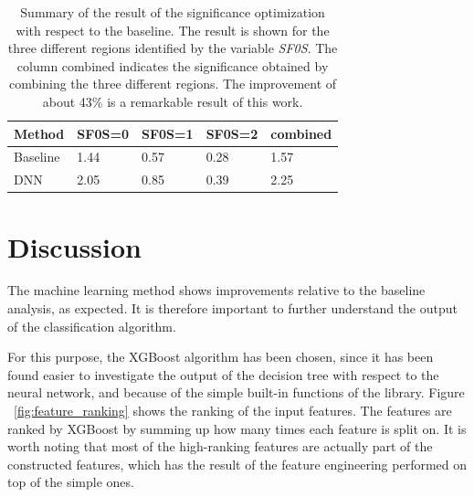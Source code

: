 \documentclass{article}
\begin{document}
\begin{table}[!h]
\centering
    \begin{tabular}{l|l|l|l|l}
    Method              & SF0S=0 & SF0S=1 & SF0S=2 & combined \\
    \hline
    Baseline            & 1.44   & 0.57   & 0.28   & 1.57     \\
    DNN                 & 2.05   & 0.85   & 0.39   & 2.25     \\
    \end{tabular}
\caption{Summary of the result of the significance optimization with respect to the baseline. The result is shown for the three different regions identified by the variable \textit{SF0S}. The column combined indicates the significance obtained by combining the three different regions. The improvement of about 43\% is a remarkable result of this work.}
\label{tab:results}
\end{table}



\section{Discussion}

The machine learning method shows improvements relative to the baseline analysis, as expected. It is therefore important to further understand the output of the classification algorithm.

For this purpose, the XGBoost algorithm has been chosen, since it has been found easier to investigate the output of the decision tree with respect to the neural network, and because of the simple built-in functions of the library.
Figure  ~\ref{fig:feature_ranking} shows the ranking of the input features. The features are ranked by XGBoost by summing up how many times each feature is split on. It is worth noting that most of the high-ranking features are actually part of the constructed features, which has the result of the feature engineering performed on top of the simple ones.
\end{document}
